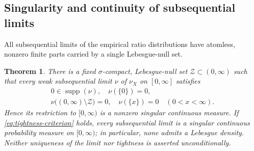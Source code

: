 \documentclass[11pt,letterpaper,reqno]{amsart}
\numberwithin{equation}{section}
\newtheorem{theorem}{Theorem}[section]
\theoremstyle{remark}
\begin{document}
\subsection{Singularity and continuity of subsequential limits}

All subsequential limits of the empirical ratio distributions have atomless, nonzero finite parts carried by a single Lebesgue-null set.

\begin{theorem}
\label{thm:dadd:universal-singularity}
There is a fixed $\sigma$-compact, Lebesgue-null set
$\mathcal{Z}\subset(0,\infty)$ such that every weak subsequential
limit $\nu$ of $\nu_X$ on $[0,\infty]$ satisfies
\begin{gather*}
 0\in\operatorname{supp}(\nu),\quad \nu(\{0\})=0,\\
 \nu\bigl((0,\infty)\setminus\mathcal{Z}\bigr)=0,\quad
 \nu(\{x\})=0\quad(0<x<\infty).
\end{gather*}
Hence its restriction to $[0,\infty)$ is a nonzero singular
continuous measure. If \eqref{eq:tightness-criterion} holds, every
subsequential limit is a singular continuous probability measure on
$[0,\infty)$; in particular, none admits a Lebesgue density.
Neither uniqueness of the limit nor tightness is asserted
unconditionally.
\end{theorem}
\end{document}
